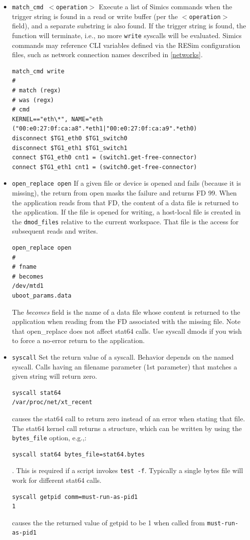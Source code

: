 \documentclass[titlepage]{article}
\begin{document}
\begin{itemize}
\item {\tt match\_cmd $<$operation$>$} Execute a list of Simics commands when the trigger string is found
in a read or write buffer (per the {\tt $<$operation$>$} field), and a separate substring is also found.  If the trigger string is
found, the function will terminate, i.e., no more {\tt write} syscalls will be evaluated.  Simics commands may reference
CLI variables defined via the RESim configuration files, such as network connection names described in \ref{networks}.
\begin{verbatim}
match_cmd write
#
# match (regx)
# was (regx)
# cmd
KERNEL=="eth\*", NAME="eth
("00:e0:27:0f:ca:a8".*eth1|"00:e0:27:0f:ca:a9".*eth0)
disconnect $TG1_eth0 $TG1_switch0
disconnect $TG1_eth1 $TG1_switch1
connect $TG1_eth0 cnt1 = (switch1.get-free-connector)
connect $TG1_eth1 cnt1 = (switch0.get-free-connector)
\end{verbatim}

\item {\tt open\_replace open} If a given file or device is opened and fails (because it is missing), the return from open
masks the failure and returns FD 99.  When the application reads from that FD, the content of a data file is returned to the application.
If the file is opened for writing, a host-local file is created in the {\tt dmod\_files} relative to the current workspace.  That file
is the access for subsequent reads and writes.
\begin{verbatim}
open_replace open
#
# fname
# becomes
/dev/mtd1
uboot_params.data
\end{verbatim}
\noindent The \textit{becomes} field is the name of a data file whose content is returned to the application when reading from the FD associated with
the missing file.  
Note that open\_replace does not affect stat64 calls.  Use syscall dmods if you wish to force a no-error return to the application.

\item {\tt syscall} Set the return value of a syscall.  Behavior depends on the named syscall.   Calls having an filename parameter (1st parameter) 
that matches a given string will return zero.  
\begin{verbatim}
syscall stat64
/var/proc/net/xt_recent
\end{verbatim}
\noindent causes the stat64 call to return zero instead of an error when stating that file.  The stat64 kernel call returns a structure,
which can be written by using the {\tt bytes\_file} option, e.g.,:
\begin{verbatim}
syscall stat64 bytes_file=stat64.bytes
\end{verbatim}
\noindent.  This is required if a script invokes {\tt test -f}.  Typically a single bytes file will work for different stat64 calls.

\begin{verbatim}
syscall getpid comm=must-run-as-pid1
1
\end{verbatim}
\noindent causes the the returned value of getpid to be 1 when called from {\tt must-run-as-pid1}
\end{itemize}
\end{document}
